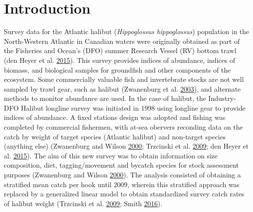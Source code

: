 \documentclass[12pt]{article}\usepackage[]{graphicx}\usepackage[]{color}
\begin{document}

\frontmatter


\renewcommand{\headrulewidth}{0.5pt}  %
\renewcommand{\footrulewidth}{0.5pt}  %

\newcommand{\lt}{\ensuremath <}
\newcommand{\gt}{\ensuremath >}


\hypertarget{sec:introduction}{%
\section{Introduction}\label{sec:introduction}}

Survey data for the Atlantic halibut (\emph{Hippoglossus hippoglossus}) population in the North-Western Atlantic in Canadian waters were originally obtained as part of the Fisheries and Ocean's (DFO) summer Research Vessel (RV) bottom trawl (den Heyer et al. \protect\hyperlink{ref-DenHeyer2015}{2015}). This survey provides indices of abundance, indices of biomass, and biological samples for groundfish and other components of the ecosystem. Some commercially valuable fish and invertebrate stocks are not well sampled by trawl gear, such as halibut (Zwanenburg et al. \protect\hyperlink{ref-Zwanenburg2003}{2003}), and alternate methods to monitor abundance are used. In the case of halibut, the Industry-DFO Halibut longline survey was initiated in 1998 using longline gear to provide indices of abundance. A fixed stations design was adopted and fishing was completed by commercial fishermen, with at-sea obervers reconding data on the catch by weight of target species (Atlantic halibut) and non-target species (anything else) (Zwanenburg and Wilson \protect\hyperlink{ref-Zwanenburg2000}{2000}; Trzcinski et al. \protect\hyperlink{ref-Trzcinski2009}{2009}; den Heyer et al. \protect\hyperlink{ref-DenHeyer2015}{2015}). The aim of this new survey was to obtain information on size composition, diet, tagging/movement and bycatch species for stock assessment purposes (Zwanenburg and Wilson \protect\hyperlink{ref-Zwanenburg2000}{2000}). The analysis consisted of obtaining a stratified mean catch per hook until 2009, wherein this stratified approach was replaced by a generalized linear model to obtain standardized survey catch rates of halibut weight (Trzcinski et al. \protect\hyperlink{ref-Trzcinski2009}{2009}; Smith \protect\hyperlink{ref-Smith2016a}{2016}).
\end{document}
